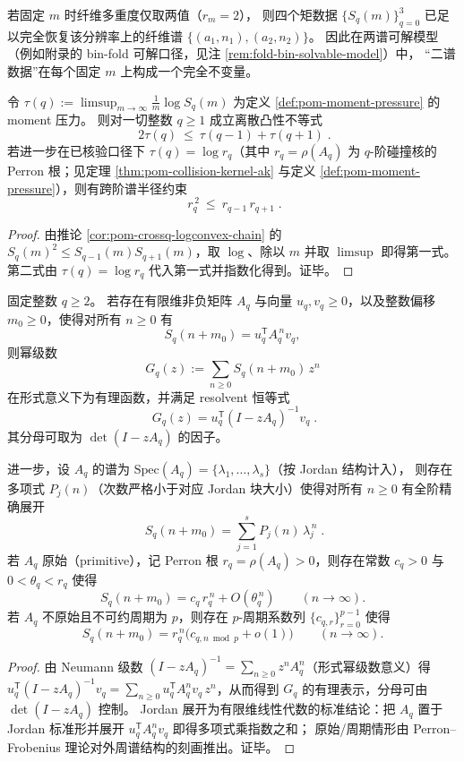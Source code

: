 \begin{corollary}[两谱情形的有限判别]\label{cor:pom-fiber-spectrum-two-atom-complete-invariant}
若固定 \(m\) 时纤维多重度仅取两值（\(r_m=2\)），
则四个矩数据 \(\{S_q(m)\}_{q=0}^{3}\) 已足以完全恢复该分辨率上的纤维谱 \(\{(a_1,n_1),(a_2,n_2)\}\)。
因此在两谱可解模型（例如附录的 bin-fold 可解口径，见注 \ref{rem:fold-bin-solvable-model}）中，
“二谱数据”在每个固定 \(m\) 上构成一个完全不变量。
\end{corollary}

\begin{corollary}\label{cor:pom-crossq-pressure-convexity}
令 \(\tau(q):=\limsup_{m\to\infty}\frac{1}{m}\log S_q(m)\) 为定义 \ref{def:pom-moment-pressure} 的 moment 压力。
则对一切整数 \(q\ge 1\) 成立离散凸性不等式
\[
\boxed{\;
2\tau(q)\ \le\ \tau(q-1)+\tau(q+1)\; }.
\]
若进一步在已核验口径下 \(\tau(q)=\log r_q\)（其中 \(r_q=\rho(A_q)\) 为 \(q\)-阶碰撞核的 Perron 根；见定理 \ref{thm:pom-collision-kernel-ak} 与定义 \ref{def:pom-moment-pressure}），则有跨阶谱半径约束
\[
\boxed{\;
r_q^{\,2}\ \le\ r_{q-1}\,r_{q+1}\; }.
\]
\end{corollary}
\begin{proof}
由推论 \ref{cor:pom-crossq-logconvex-chain} 的 \(S_q(m)^2\le S_{q-1}(m)S_{q+1}(m)\)，取 \(\log\)、除以 \(m\) 并取 \(\limsup\) 即得第一式。
第二式由 \(\tau(q)=\log r_q\) 代入第一式并指数化得到。证毕。
\end{proof}

\begin{proposition}\label{prop:pom-moment-genfunc-jordan}
固定整数 \(q\ge 2\)。
若存在有限维非负矩阵 \(A_q\) 与向量 \(u_q,v_q\ge 0\)，以及整数偏移 \(m_0\ge 0\)，使得对所有 \(n\ge 0\) 有
\[
S_q(n+m_0)=u_q^{\mathsf T}A_q^{\,n}v_q,
\]
则幂级数
\[
G_q(z):=\sum_{n\ge 0} S_q(n+m_0)\,z^n
\]
在形式意义下为有理函数，并满足 resolvent 恒等式
\[
\boxed{\;
G_q(z)=u_q^{\mathsf T}(I-zA_q)^{-1}v_q\; }.
\]
其分母可取为 \(\det(I-zA_q)\) 的因子。
\par
进一步，设 \(A_q\) 的谱为 \(\mathrm{Spec}(A_q)=\{\lambda_1,\dots,\lambda_s\}\)（按 Jordan 结构计入），
则存在多项式 \(P_j(n)\)（次数严格小于对应 Jordan 块大小）使得对所有 \(n\ge 0\) 有全阶精确展开
\[
\boxed{\;
S_q(n+m_0)=\sum_{j=1}^{s} P_j(n)\,\lambda_j^{\,n}\; }.
\]
若 \(A_q\) 原始（primitive），记 Perron 根 \(r_q=\rho(A_q)>0\)，则存在常数 \(c_q>0\) 与 \(0<\theta_q<r_q\) 使得
\[
S_q(n+m_0)=c_q\,r_q^{\,n}+O(\theta_q^{\,n})\qquad(n\to\infty).
\]
若 \(A_q\) 不原始且不可约周期为 \(p\)，则存在 \(p\)-周期系数列 \(\{c_{q,r}\}_{r=0}^{p-1}\) 使得
\[
S_q(n+m_0)=r_q^{\,n}\bigl(c_{q,n\bmod p}+o(1)\bigr)\qquad(n\to\infty).
\]
\end{proposition}
\begin{proof}
由 Neumann 级数 \((I-zA_q)^{-1}=\sum_{n\ge 0} z^nA_q^n\)（形式幂级数意义）得
\(
u_q^{\mathsf T}(I-zA_q)^{-1}v_q=\sum_{n\ge 0}u_q^{\mathsf T}A_q^n v_q\,z^n
\)，从而得到 \(G_q\) 的有理表示，分母可由 \(\det(I-zA_q)\) 控制。
Jordan 展开为有限维线性代数的标准结论：把 \(A_q\) 置于 Jordan 标准形并展开 \(u_q^{\mathsf T}A_q^{n}v_q\) 即得多项式乘指数之和；
原始/周期情形由 Perron--Frobenius 理论对外周谱结构的刻画推出。证毕。
\end{proof}

